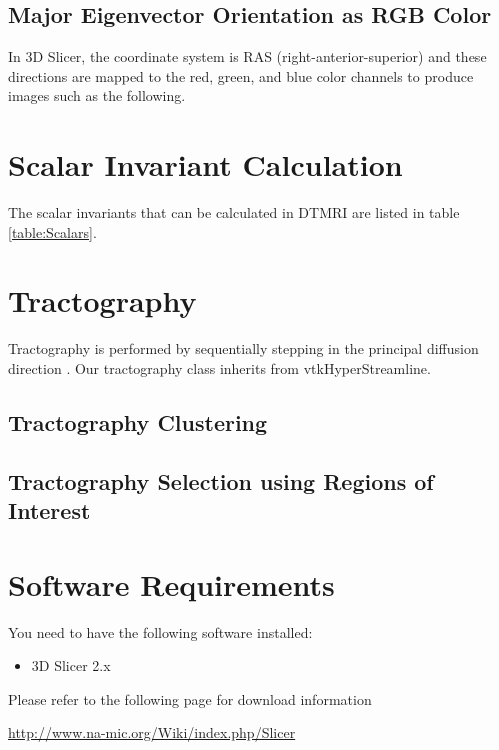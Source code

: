 \documentclass{InsightArticle}
\begin{document}
\subsection{Major Eigenvector Orientation as RGB Color}

In 3D Slicer, the coordinate system is RAS (right-anterior-superior)
and these directions are mapped to the red, green, and blue color
channels \cite{pajevic99} to produce images such as the following.


\section{Scalar Invariant Calculation}
The scalar invariants that can be calculated in DTMRI are listed in table \ref{table:Scalars}.

\section{Tractography}
Tractography is performed by sequentially stepping in the principal
diffusion direction \cite{basser00,conturo99,mori99,westin99}.  Our
tractography class inherits from vtkHyperStreamline.

\subsection{Tractography Clustering}
\subsection{Tractography Selection using Regions of Interest}


\section{Software Requirements}

You need to have the following software installed:

\begin{itemize}
  \item  3D Slicer 2.x
\end{itemize}

Please refer to the following page for download information

\url{http://www.na-mic.org/Wiki/index.php/Slicer}
\end{document}
